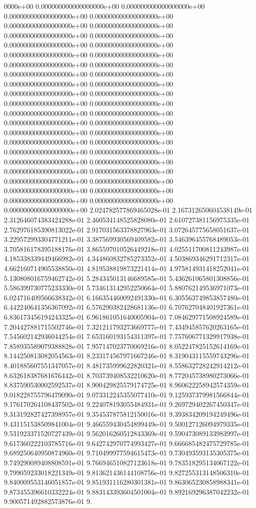 0000e+00	0.000000000000000000e+00	0.000000000000000000e+00	0.000000000000000000e+00	0.000000000000000000e+00	0.000000000000000000e+00	0.000000000000000000e+00	0.000000000000000000e+00	0.000000000000000000e+00	0.000000000000000000e+00	0.000000000000000000e+00	0.000000000000000000e+00	0.000000000000000000e+00	0.000000000000000000e+00	0.000000000000000000e+00	0.000000000000000000e+00	0.000000000000000000e+00	0.000000000000000000e+00	0.000000000000000000e+00	0.000000000000000000e+00	0.000000000000000000e+00	0.000000000000000000e+00	0.000000000000000000e+00	0.000000000000000000e+00	0.000000000000000000e+00	0.000000000000000000e+00	0.000000000000000000e+00	0.000000000000000000e+00	0.000000000000000000e+00	0.000000000000000000e+00	0.000000000000000000e+00	0.000000000000000000e+00	0.000000000000000000e+00	0.000000000000000000e+00	0.000000000000000000e+00	0.000000000000000000e+00	0.000000000000000000e+00	0.000000000000000000e+00	0.000000000000000000e+00	0.000000000000000000e+00	0.000000000000000000e+00	0.000000000000000000e+00	0.000000000000000000e+00	0.000000000000000000e+00	2.024782577869465028e-01	2.167312650604538149e-01	2.312646074383424288e-01	2.460534148525828080e-01	2.610727381156975335e-01	2.762976185390813022e-01	2.917031563378827963e-01	3.072645775658051637e-01	3.229572993304771211e-01	3.387569930569409582e-01	3.546396455768489053e-01	3.705816178395188176e-01	3.865597010526449218e-01	4.025511700811243987e-01	4.185338339449466982e-01	4.344860832785273352e-01	4.503869346291712317e-01	4.662160714905538850e-01	4.819538819873221414e-01	4.975814931418252041e-01	5.130808016759462742e-01	5.284345013146689585e-01	5.436261065801308856e-01	5.586399730775233330e-01	5.734613142952250664e-01	5.880762149536971073e-01	6.024716409566638342e-01	6.166354460092491330e-01	6.305563749853857480e-01	6.442240641356367092e-01	6.576290382428681136e-01	6.707627048401927361e-01	6.836173456194243325e-01	6.961861051640005904e-01	7.084629771508924589e-01	7.204427881715502746e-01	7.321211793273669777e-01	7.434945857620263165e-01	7.545602142936044254e-01	7.653160193154311397e-01	7.757606771329917938e-01	7.858935589079388828e-01	7.957147023770069216e-01	8.052247825152614169e-01	8.144250813082054563e-01	8.233174567971667246e-01	8.319043115559743296e-01	8.401885607551347057e-01	8.481735999622820321e-01	8.558632728242914212e-01	8.632618387681676442e-01	8.703739408532210620e-01	8.772045738980273066e-01	8.837590530002592537e-01	8.900429825579174725e-01	8.960622258942574359e-01	9.018228755796479090e-01	9.073312245355077410e-01	9.125937379981566844e-01	9.176170264108437502e-01	9.224078193055484931e-01	9.269729402267450347e-01	9.313192827427398957e-01	9.354537875812150016e-01	9.393834209194249496e-01	9.431151538509841004e-01	9.466559430454899449e-01	9.500127126094979335e-01	9.531923371520727439e-01	9.562016260512843369e-01	9.590473089133983997e-01	9.617360222103785716e-01	9.642742970774993427e-01	9.666685482475729785e-01	9.689250640950874960e-01	9.710499977594615473e-01	9.730493593135305375e-01	9.749290089408808591e-01	9.766946510827123618e-01	9.783518295134067122e-01	9.799059233018221349e-01	9.813621436144108756e-01	9.827255313148506310e-01	9.840009553146051857e-01	9.851931116280301381e-01	9.863065230858988341e-01	9.873455396610332224e-01	9.883143393604501004e-01	9.892169296387042232e-01	9.900571492882573876e-01	9.